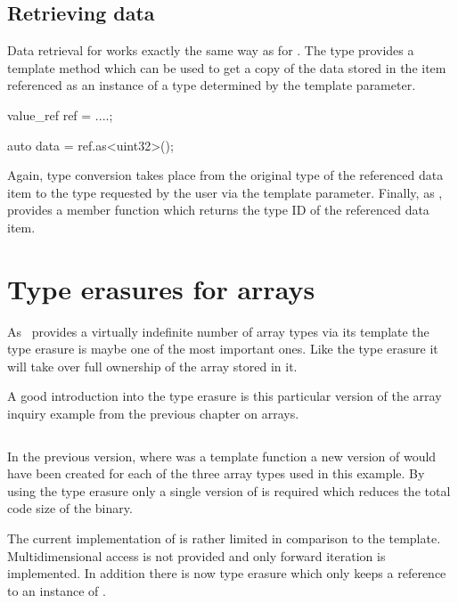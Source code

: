 \subsection{Retrieving data}

Data retrieval for  works exactly the same way as for
. The type provides a template method  which can be 
used to get a copy of the data stored in the item referenced as an instance 
of a type determined by the template parameter. 
\begin{cppcode}
value_ref ref = ....;

auto data = ref.as<uint32>();
\end{cppcode}
Again, type conversion takes place from the original type of the referenced 
data item to the type requested by the user via the template parameter. 
Finally, as ,  provides a  member 
function which returns the type ID of the referenced data item.


\section{Type erasures for arrays}

As \libpnicore\ provides a virtually indefinite number of array types via its
 template the  type erasure is maybe one of the most
important ones. Like the  type erasure it will take over full
ownership of the array stored in it.

A good introduction into the  type erasure is this particular version
of the array inquiry  example from the previous chapter on arrays. 
\inputminted[linenos,
             fontsize=\small,
             firstnumber=25,
             firstline=25,
             lastline=62,
             frame=lines,
             label=examples/type\_erasure3.cpp]
{cpp}{../examples/type_erasure3.cpp}
In the previous version, where  was a template function a new
version of  would have been created for each of the three array
types used in this example. By using the type erasure only a single version of
 is required which reduces the total code size of the binary.

The current implementation of  is rather limited in comparison 
to the  template. Multidimensional access is not provided and only
forward iteration is implemented. In addition there is now  
type erasure which only keeps a reference to an instance of . 

